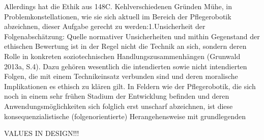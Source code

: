 


Allerdings  hat  die  Ethik  aus  
148C. Kehlverschiedenen  Gründen  Mühe,  in  Problemkonstellationen,  wie  sie  sich  aktuell  im  Bereich der Pflegerobotik abzeichnen, dieser Aufgabe gerecht zu werden:1.Unsicherheit  der  Folgenabschätzung:  Quelle  normativer  Unsicherheiten  und  mithin  Gegenstand der ethischen Bewertung ist in der Regel nicht die Technik an sich, sondern deren  Rolle  in  konkreten  soziotechnischen  Handlungszusammenhängen  (Grunwald  2013a, S.4). Dazu gehören wesentlich die intendierten sowie nicht intendierten Folgen, die  mit  einem  Technikeinsatz  verbunden  sind  und  deren  moralische  Implikationen  es  ethisch  zu  klären  gilt.  In  Feldern  wie  der  Pflegerobotik,  die  sich  noch  in  einem  sehr  frühen  Stadium  der  Entwicklung  befinden  und  deren  Anwendungsmöglichkeiten  sich  folglich  erst  unscharf  abzeichnen,  ist  diese  konsequenzialistische  (folgenorientierte)  Herangehensweise  mit  grundlegenden 



VALUES IN DESIGN!!!
